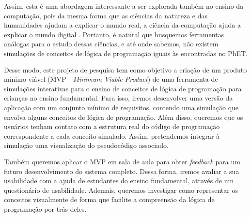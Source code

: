 Assim, esta é uma abordagem interessante a ser explorada também no ensino da computação, pois da mesma forma que as ciências da natureza e das humanidades ajudam a explicar o mundo real, a ciência da computação ajuda a explicar o mundo digital \citep{ribeiro2019diretrizes}. Portanto, é natural que busquemos ferramentas análogas para o estudo dessas ciências, e até onde sabemos, não existem simulações de conceitos de lógica de programação iguais às encontradas no PhET.

Desse modo, este projeto de pesquisa tem como objetivo a criação de um produto mínimo viável (MVP - \textit{Minimum Viable Product}) de uma ferramenta de simulações interativas para o ensino de conceitos de lógica de programação para crianças no ensino fundamental. Para isso, iremos desenvolver uma versão da aplicação com um conjunto mínimo de requisitos, contendo uma simulação que envolva alguns conceitos de lógica de programação. Além disso, queremos que os usuários tenham contato com a estrutura real do código de programação correspondente a cada conceito simulado. Assim, pretendemos integrar à simulação uma visualização do pseudocódigo associado.

Também queremos aplicar o MVP em sala de aula para obter \textit{feedback} para um futuro desenvolvimento do sistema completo. Dessa forma, iremos avaliar a sua usabilidade com a ajuda de estudantes do ensino fundamental, através de um questionário de usabilidade. Ademais, queremos investigar como representar os conceitos visualmente de forma que facilite a compreensão da lógica de programação por trás deles.

